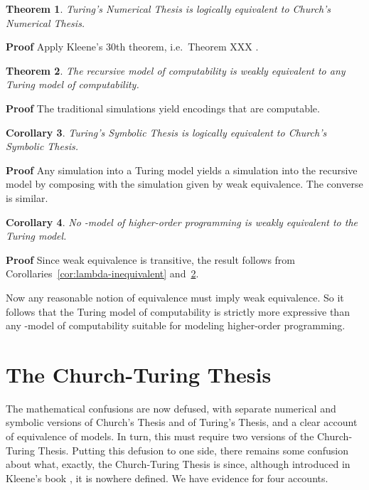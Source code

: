 \documentclass[a4paper]{article}
\newtheorem{theorem}{Theorem}
\newtheorem{corollary}[theorem]{Corollary}
\newenvironment{proof}
	{\par\noindent\upshape\textbf{Proof}\quad}
	{\hspace*{\fill}}
\begin{document}
\begin{theorem}Turing's Numerical Thesis is logically equivalent to Church's Numerical Thesis.
\end{theorem}
\begin{proof}
  Apply Kleene's 30th theorem, i.e.\ Theorem XXX \cite[page 376]{Kleene52}.
\end{proof}



\begin{theorem}
\label{thm:recursive-Turing}
  The recursive model of computability is weakly equivalent to any
  Turing model of computability. 
\end{theorem}

\begin{proof}
  The traditional simulations yield encodings that are computable. 
\end{proof}

\begin{corollary}Turing's Symbolic Thesis is logically equivalent to Church's Symbolic Thesis.
\end{corollary}
\begin{proof}
  Any simulation into a Turing model yields a simulation into the
  recursive model by composing with the simulation given by weak
  equivalence. The converse is similar.
\end{proof}
 

\begin{corollary}
\label{cor:lambda-inequivalent-Turing}
No -model of higher-order programming is weakly equivalent to the
Turing model.
\end{corollary}

\begin{proof}
  Since weak equivalence is transitive, the result follows from Corollaries~\ref{cor:lambda-inequivalent} and~\ref{thm:recursive-Turing}. 
\end{proof}

Now any reasonable notion of equivalence must imply weak equivalence.
So it follows that the Turing model of computability is strictly more
expressive than any -model of computability suitable for modeling
higher-order programming.


\section{The Church-Turing Thesis}
\label{sec:Church-Turing}

The mathematical confusions are now defused, with separate numerical and
symbolic versions of Church's Thesis and of Turing's Thesis, and a
clear account of equivalence of models. In turn, this must require two
versions of the Church-Turing Thesis. Putting this defusion to one
side, there remains some confusion about what, exactly, the
Church-Turing Thesis is since, although introduced in Kleene's book
\cite[page 382]{Kleene52}, it is nowhere defined. We have evidence
for four accounts.
\end{document}
